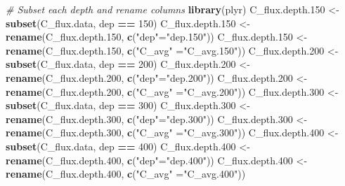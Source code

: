 \documentclass[]{article}
\newenvironment{Shaded}{\begin{snugshade}}{\end{snugshade}}
\newcommand{\CommentTok}[1]{\textcolor[rgb]{0.56,0.35,0.01}{\textit{#1}}}
\newcommand{\DecValTok}[1]{\textcolor[rgb]{0.00,0.00,0.81}{#1}}
\newcommand{\FloatTok}[1]{\textcolor[rgb]{0.00,0.00,0.81}{#1}}
\newcommand{\KeywordTok}[1]{\textcolor[rgb]{0.13,0.29,0.53}{\textbf{#1}}}
\newcommand{\NormalTok}[1]{#1}
\newcommand{\OperatorTok}[1]{\textcolor[rgb]{0.81,0.36,0.00}{\textbf{#1}}}
\newcommand{\StringTok}[1]{\textcolor[rgb]{0.31,0.60,0.02}{#1}}
\begin{document}
\begin{Shaded}
\begin{Highlighting}[]
\CommentTok{# Subset each depth and rename columns }
\KeywordTok{library}\NormalTok{(plyr)}
\NormalTok{C_flux.depth}\FloatTok{.150}\NormalTok{ <-}\StringTok{ }\KeywordTok{subset}\NormalTok{(C_flux.data, dep }\OperatorTok{==}\StringTok{ }\DecValTok{150}\NormalTok{)}
\NormalTok{C_flux.depth}\FloatTok{.150}\NormalTok{ <-}\StringTok{ }\KeywordTok{rename}\NormalTok{(C_flux.depth}\FloatTok{.150}\NormalTok{, }\KeywordTok{c}\NormalTok{(}\StringTok{"dep"}\NormalTok{=}\StringTok{"dep.150"}\NormalTok{))}
\NormalTok{C_flux.depth}\FloatTok{.150}\NormalTok{ <-}\StringTok{ }\KeywordTok{rename}\NormalTok{(C_flux.depth}\FloatTok{.150}\NormalTok{, }\KeywordTok{c}\NormalTok{(}\StringTok{"C_avg"}\NormalTok{ =}\StringTok{"C_avg.150"}\NormalTok{))}
\NormalTok{C_flux.depth}\FloatTok{.200}\NormalTok{ <-}\StringTok{ }\KeywordTok{subset}\NormalTok{(C_flux.data, dep }\OperatorTok{==}\StringTok{ }\DecValTok{200}\NormalTok{)}
\NormalTok{C_flux.depth}\FloatTok{.200}\NormalTok{ <-}\StringTok{ }\KeywordTok{rename}\NormalTok{(C_flux.depth}\FloatTok{.200}\NormalTok{, }\KeywordTok{c}\NormalTok{(}\StringTok{"dep"}\NormalTok{=}\StringTok{"dep.200"}\NormalTok{))}
\NormalTok{C_flux.depth}\FloatTok{.200}\NormalTok{ <-}\StringTok{ }\KeywordTok{rename}\NormalTok{(C_flux.depth}\FloatTok{.200}\NormalTok{, }\KeywordTok{c}\NormalTok{(}\StringTok{"C_avg"}\NormalTok{ =}\StringTok{"C_avg.200"}\NormalTok{))}
\NormalTok{C_flux.depth}\FloatTok{.300}\NormalTok{ <-}\StringTok{ }\KeywordTok{subset}\NormalTok{(C_flux.data, dep }\OperatorTok{==}\StringTok{ }\DecValTok{300}\NormalTok{)}
\NormalTok{C_flux.depth}\FloatTok{.300}\NormalTok{ <-}\StringTok{ }\KeywordTok{rename}\NormalTok{(C_flux.depth}\FloatTok{.300}\NormalTok{, }\KeywordTok{c}\NormalTok{(}\StringTok{"dep"}\NormalTok{=}\StringTok{"dep.300"}\NormalTok{))}
\NormalTok{C_flux.depth}\FloatTok{.300}\NormalTok{ <-}\StringTok{ }\KeywordTok{rename}\NormalTok{(C_flux.depth}\FloatTok{.300}\NormalTok{, }\KeywordTok{c}\NormalTok{(}\StringTok{"C_avg"}\NormalTok{ =}\StringTok{"C_avg.300"}\NormalTok{))}
\NormalTok{C_flux.depth}\FloatTok{.400}\NormalTok{ <-}\StringTok{ }\KeywordTok{subset}\NormalTok{(C_flux.data, dep }\OperatorTok{==}\StringTok{ }\DecValTok{400}\NormalTok{)}
\NormalTok{C_flux.depth}\FloatTok{.400}\NormalTok{ <-}\StringTok{ }\KeywordTok{rename}\NormalTok{(C_flux.depth}\FloatTok{.400}\NormalTok{, }\KeywordTok{c}\NormalTok{(}\StringTok{"dep"}\NormalTok{=}\StringTok{"dep.400"}\NormalTok{))}
\NormalTok{C_flux.depth}\FloatTok{.400}\NormalTok{ <-}\StringTok{ }\KeywordTok{rename}\NormalTok{(C_flux.depth}\FloatTok{.400}\NormalTok{, }\KeywordTok{c}\NormalTok{(}\StringTok{"C_avg"}\NormalTok{ =}\StringTok{"C_avg.400"}\NormalTok{))}
\end{Highlighting}
\end{Shaded}
\end{document}
